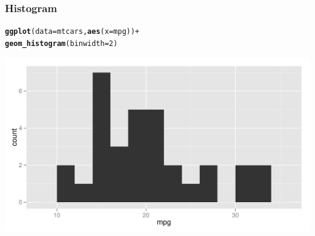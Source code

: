 \documentclass[12pt]{beamer}\usepackage[]{graphicx}\usepackage[]{color}
\makeatletter
\newcommand{\hlnum}[1]{\textcolor[rgb]{0.686,0.059,0.569}{#1}}%
\newcommand{\hlopt}[1]{\textcolor[rgb]{0,0,0}{#1}}%
\newcommand{\hlstd}[1]{\textcolor[rgb]{0.345,0.345,0.345}{#1}}%
\newcommand{\hlkwc}[1]{\textcolor[rgb]{0.333,0.667,0.333}{#1}}%
\newcommand{\hlkwd}[1]{\textcolor[rgb]{0.737,0.353,0.396}{\textbf{#1}}}%
\newenvironment{kframe}{%
 \def\at@end@of@kframe{}%
 \ifinner\ifhmode%
  \def\at@end@of@kframe{\end{minipage}}%
  \begin{minipage}{\columnwidth}%
 \fi\fi%
 \def\FrameCommand##1{\hskip\@totalleftmargin \hskip-\fboxsep
 \colorbox{shadecolor}{##1}\hskip-\fboxsep
     \hskip-\linewidth \hskip-\@totalleftmargin \hskip\columnwidth}%
 \MakeFramed {\advance\hsize-\width
   \@totalleftmargin\z@ \linewidth\hsize
   \@setminipage}}%
 {\par\unskip\endMakeFramed%
 \at@end@of@kframe}
\newenvironment{knitrout}{}{} %
\makeatother
\begin{document}
\begin{frame}[fragile]
\frametitle{Histogram}

\begin{knitrout}\scriptsize
{}\color{fgcolor}\begin{kframe}
\begin{alltt}
\hlkwd{ggplot}\hlstd{(}\hlkwc{data} \hlstd{= mtcars,} \hlkwd{aes}\hlstd{(}\hlkwc{x} \hlstd{= mpg))} \hlopt{+}
  \hlkwd{geom_histogram}\hlstd{(}\hlkwc{binwidth} \hlstd{=} \hlnum{2}\hlstd{)}
\end{alltt}
\end{kframe}

{\centering \includegraphics[width=.9\linewidth,height=.5\linewidth]{figure/unnamed-chunk-6-1} 

}



\end{knitrout}

\end{frame}

\end{document}
